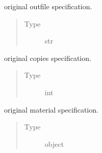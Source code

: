\documentclass[letterpaper,10pt,english]{sphinxmanual}
\begin{document}
\begin{fulllineitems}
\begin{quote}
\begin{description}
\begin{itemize}
\end{itemize}

\end{description}\end{quote}

\begin{fulllineitems}
\label{\detokenize{interface:scdc.interface.Configuration.outfile}}
original outfile specification.
\begin{quote}\begin{description}
\item[{Type}] \leavevmode
str

\end{description}\end{quote}

\end{fulllineitems}


\begin{fulllineitems}
\label{\detokenize{interface:scdc.interface.Configuration.copies}}
original copies specification.
\begin{quote}\begin{description}
\item[{Type}] \leavevmode
int

\end{description}\end{quote}

\end{fulllineitems}


\begin{fulllineitems}
\label{\detokenize{interface:scdc.interface.Configuration.material}}
original material specification.
\begin{quote}\begin{description}
\item[{Type}] \leavevmode
object

\end{description}\end{quote}


\end{fulllineitems}
\end{fulllineitems}
\end{document}
